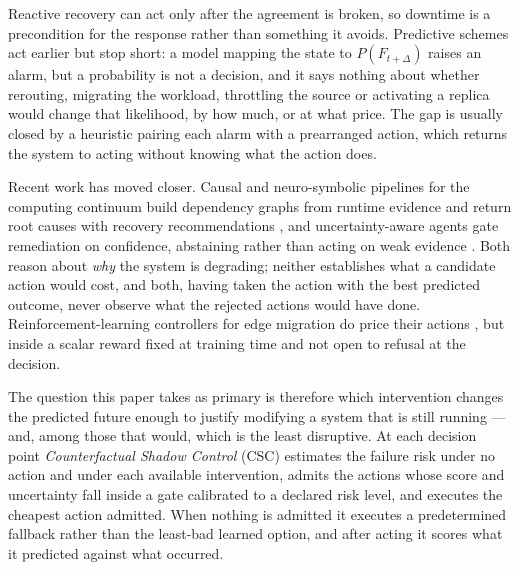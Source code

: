\documentclass[journal]{IEEEtran}
\begin{document}
Reactive recovery can act only after the agreement is broken, so downtime is a
precondition for the response rather than something it avoids. Predictive
schemes act earlier but stop short: a model mapping the state to
$P(F_{t+\Delta})$ raises an alarm, but a probability is not a decision, and it
says nothing about whether rerouting, migrating the workload, throttling the
source or activating a replica would change that likelihood, by how much, or at
what price. The gap is usually closed by a heuristic pairing each alarm with a
prearranged action, which returns the system to acting without knowing what the
action does.

Recent work has moved closer. Causal and neuro-symbolic pipelines for the
computing continuum build dependency graphs from runtime evidence and return
root causes with recovery recommendations \cite{ye2026nesyedge}, and
uncertainty-aware agents gate remediation on confidence, abstaining rather than
acting on weak evidence \cite{desilva2026aurora}. Both reason about \emph{why}
the system is degrading; neither establishes what a candidate action would cost,
and both, having taken the action with the best predicted outcome, never observe
what the rejected actions would have done. Reinforcement-learning controllers
for edge migration do price their actions \cite{siew2022fire}, but inside a
scalar reward fixed at training time and not open to refusal at the decision.

The question this paper takes as primary is therefore which intervention changes
the predicted future enough to justify modifying a system that is still running
--- and, among those that would, which is the least disruptive. At each decision
point \emph{Counterfactual Shadow Control} (CSC) estimates the failure risk under
no action and under each available intervention, admits the actions whose score
and uncertainty fall inside a gate calibrated to a declared risk level, and
executes the cheapest action admitted. When nothing is admitted it executes a
predetermined fallback rather than the least-bad learned option, and after
acting it scores what it predicted against what occurred.
\end{document}
